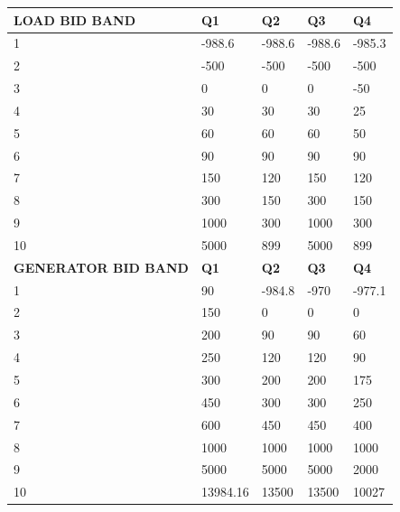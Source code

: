 \begin{center}
\begin{table}[]
\begin{tabular}{|l|l|l|l|l|}
\hline
\textbf{LOAD BID BAND}      & \textbf{Q1} & \textbf{Q2} & \textbf{Q3} & \textbf{Q4} \\ \hline
1                  & -988.6      & -988.6      & -988.6      & -985.3      \\ \hline
2                  & -500        & -500        & -500        & -500        \\ \hline
3                  & 0           & 0           & 0           & -50         \\ \hline
4                  & 30          & 30          & 30          & 25          \\ \hline
5                  & 60          & 60          & 60          & 50          \\ \hline
6                  & 90          & 90          & 90          & 90          \\ \hline
7                  & 150         & 120         & 150         & 120         \\ \hline
8                  & 300         & 150         & 300         & 150         \\ \hline
9                  & 1000        & 300         & 1000        & 300         \\ \hline
10                 & 5000        & 899         & 5000        & 899         \\ \hline
\textbf{GENERATOR BID BAND} & \textbf{Q1} & \textbf{Q2} & \textbf{Q3} & \textbf{Q4} \\ \hline
1                  & 90          & -984.8      & -970        & -977.1      \\ \hline
2                  & 150         & 0           & 0           & 0           \\ \hline
3                  & 200         & 90          & 90          & 60          \\ \hline
4                  & 250         & 120         & 120         & 90          \\ \hline
5                  & 300         & 200         & 200         & 175         \\ \hline
6                  & 450         & 300         & 300         & 250         \\ \hline
7                  & 600         & 450         & 450         & 400         \\ \hline
8                  & 1000        & 1000        & 1000        & 1000        \\ \hline
9                  & 5000        & 5000        & 5000        & 2000        \\ \hline
10                 & 13984.16    & 13500       & 13500       & 10027       \\ \hline
\end{tabular}
\end{table}
\end{center}
